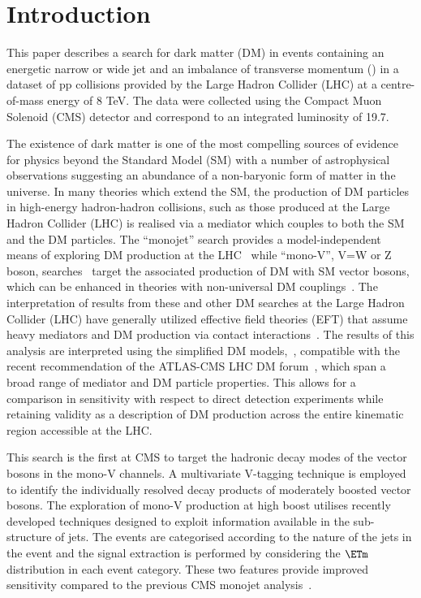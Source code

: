 \section{Introduction}
This paper describes a search for dark matter (DM) in events containing an energetic narrow or wide jet and an imbalance of transverse momentum (\ETm) in a dataset 
of pp collisions provided by the Large Hadron Collider (LHC) at a centre-of-mass energy of 8 TeV. The data were collected using the Compact Muon Solenoid (CMS) 
detector and correspond to an integrated luminosity of 19.7\fbinv. 

The existence of dark matter is one of the most compelling sources of evidence for physics beyond the Standard Model (SM) with a number of astrophysical observations 
suggesting an abundance of a non-baryonic form of matter in the universe. In many theories which extend the SM, the production of DM particles in high-energy hadron-hadron 
collisions, such as those produced at the Large Hadron Collider (LHC) is realised via a mediator which couples to both the SM and the DM particles.  
The ``monojet'' search provides a model-independent means of exploring DM production at the LHC~\cite{monojet1,monojet2} while 
 ``mono-V'', V=W or Z boson, searches~\cite{monolep,Aad:2014vka,Aad:2013oja,ATLAS:2014wra} target the associated production of DM with SM vector bosons, 
which can be enhanced in theories with non-universal DM couplings~\cite{IVDM}.  The interpretation of results from these and other DM searches at 
the Large Hadron Collider (LHC) have generally utilized effective field theories (EFT) that assume heavy mediators and DM production via contact interactions~\cite{Fox:2011pm}.  
The results of this analysis are interpreted using the simplified DM models,~\cite{simplified1,Buchmueller:2013dya,Buchmueller:2014yoa}, compatible with the recent recommendation of the ATLAS-CMS LHC DM forum~\cite{Abercrombie:2015wmb}, which span a broad range of 
mediator and DM particle properties. This allows for a comparison in sensitivity with respect to direct detection experiments while retaining validity as a description of DM 
production across the entire kinematic region accessible at the LHC. 

This search is the first at CMS to target the hadronic decay modes of the vector bosons in the mono-V channels. A multivariate V-tagging technique is 
employed to identify the individually resolved decay products of moderately boosted vector bosons. The exploration of mono-V production at high boost 
utilises recently developed techniques designed to exploit information 
available in the sub-structure of jets. The events are categorised according to the nature of the jets in the event and the signal extraction is performed by 
considering the $\ETm$ distribution in each event category. These two features provide improved sensitivity compared to the previous CMS monojet analysis~\cite{monojet1}. 


